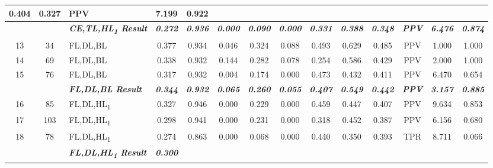 \begin{table}[H]
{\begin{tabular}{cc|l|c|c|c|c|c|c|c|c|c|c|c|}
    0.404 &
    0.327 &
    PPV &
    7.199 &
    0.922 \\ \hline
  \textit{\textbf{}} &
    \textit{\textbf{}} &
    \textit{\textbf{CE,TL,HL\textsubscript{1} Result}} &
    \textit{\textbf{0.272}} &
    \textit{\textbf{0.936}} &
    \textit{\textbf{0.000}} &
    \textit{\textbf{0.090}} &
    \textit{\textbf{0.000}} &
    \textit{\textbf{0.331}} &
    \textit{\textbf{0.388}} &
    \textit{\textbf{0.348}} &
    \textit{\textbf{PPV}} &
    \textit{\textbf{6.476}} &
    \textit{\textbf{0.874}} \\ \hline
  \multicolumn{1}{|c|}{13} &
    34 &
    FL,DL,BL &
    0.377 &
    0.934 &
    0.046 &
    0.324 &
    0.088 &
    0.493 &
    0.629 &
    0.485 &
    PPV &
    1.000 &
    1.000 \\ \hline
  \multicolumn{1}{|c|}{14} &
    69 &
    FL,DL,BL &
    0.338 &
    0.932 &
    0.144 &
    0.282 &
    0.078 &
    0.254 &
    0.586 &
    0.429 &
    PPV &
    2.000 &
    1.000 \\ \hline
  \multicolumn{1}{|c|}{15} &
    76 &
    FL,DL,BL &
    0.317 &
    0.932 &
    0.004 &
    0.174 &
    0.000 &
    0.473 &
    0.432 &
    0.411 &
    PPV &
    6.470 &
    0.654 \\ \hline
  \textit{\textbf{}} &
    \textit{\textbf{}} &
    \textit{\textbf{FL,DL,BL Result}} &
    \textit{\textbf{0.344}} &
    \textit{\textbf{0.932}} &
    \textit{\textbf{0.065}} &
    \textit{\textbf{0.260}} &
    \textit{\textbf{0.055}} &
    \textit{\textbf{0.407}} &
    \textit{\textbf{0.549}} &
    \textit{\textbf{0.442}} &
    \textit{\textbf{PPV}} &
    \textit{\textbf{3.157}} &
    \textit{\textbf{0.885}} \\ \hline
  \multicolumn{1}{|c|}{16} &
    85 &
    FL,DL,HL\textsubscript{1} &
    0.327 &
    0.946 &
    0.000 &
    0.229 &
    0.000 &
    0.459 &
    0.447 &
    0.407 &
    PPV &
    9.634 &
    0.853 \\ \hline
  \multicolumn{1}{|c|}{17} &
    103 &
    FL,DL,HL\textsubscript{1} &
    0.298 &
    0.941 &
    0.000 &
    0.231 &
    0.000 &
    0.318 &
    0.452 &
    0.387 &
    PPV &
    6.156 &
    0.680 \\ \hline
  \multicolumn{1}{|c|}{18} &
    78 &
    FL,DL,HL\textsubscript{1} &
    0.274 &
    0.863 &
    0.000 &
    0.068 &
    0.000 &
    0.440 &
    0.350 &
    0.393 &
    TPR &
    8.711 &
    0.066 \\ \hline
  \textit{\textbf{}} &
    \textit{\textbf{}} &
    \textit{\textbf{FL,DL,HL\textsubscript{1} Result}} &
    \textit{\textbf{0.300}} &

\end{tabular}}
\end{table}
